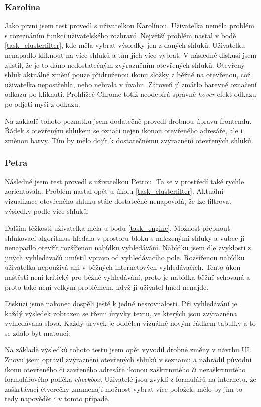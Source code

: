 \subsubsection{Karolína}
Jako první jsem test provedl s uživatelkou Karolínou. Uživatelka neměla problém s rozeznáním funkcí uživatelského rozhraní. Největší problém nastal v bodě \ref{task_clusterfilter}, kde měla vybrat výsledky jen z daných shluků. Uživatelku nenapadlo kliknout na více shluků a tím jich více vybrat. V následné diskusi jsem zjistil, že je to dáno nedostatečným zvýrazněním otevřených shluků. Otevřený shluk aktuálně změní pouze přidruženou ikonu složky z běžné na otevřenou, což uživatelka nepostřehla, nebo nebrala v úvahu. Zároveň jí zmátlo barevné označení odkazu po kliknutí. Prohlížeč Chrome totiž neodebírá správně \emph{hover} efekt odkazu po odjetí myši z odkazu.

Na základě tohoto poznatku jsem dodatečně provedl drobnou úpravu frontendu. Řádek s otevřeným shlukem se označí nejen ikonou otevřeného adresáře, ale i změnou barvy. Tím by mělo dojít k dostatečnému zvýraznění otevřených shluků.

\subsubsection{Petra}
Následně jsem test provedl s uživatelkou Petrou. Ta se v prostředí také rychle zorientovala. Problém nastal opět u úkolu \ref{task_clusterfilter}. Aktuální vizualizace otevřeného shluku stále dostatečně nenapovídá, že lze filtrovat výsledky podle více shluků.

Dalším těžkosti uživatelka měla u bodu \ref{task_engine}. Možnost přepnout shlukovací algoritmus hledala v prostoru bloku s nalezenými shluky a vůbec ji nenapadlo otevřít rozšířenou nabídku vyhledávání. Nabídku jsem dle zvyklostí z jiných vyhledávačů umístil vpravo od vyhledávacího pole. Rozšířenou nabídku uživatelka nepoužívá ani v běžných internetových vyhledávačích. Tento úkon naštěstí není kritický pro běžné vyhledávání, proto je nabídka běžně schovaná a proto také není velkým problémem, když ji uživatel hned nenajde. 

Diskuzí jsme nakonec dospěli ještě k jedné nesrovnalosti. Při vyhledávání je každý výsledek zobrazen se třemi úryvky textu, ve kterých jsou zvýrazněna vyhledávaná slova. Každý úryvek je oddělen vizuálně novým řádkem tabulky a to se zdálo být matoucí.

Na základě výsledků tohoto testu jsem opět vyvodil drobné změny v návrhu UI. Znovu jsem opravil zvýraznění otevřených shluků v seznamu a nahradil původní ikonu otevřeného či zavřeného adresáře ikonou zaškrtnutého či nezaškrtnutého formulářového políčka \emph{checkbox}. Uživatelé jsou zvyklí z formulářů na internetu, že zaškrtávací čtverečky znamenají možnost vybrat více položek, mělo by jim to tedy napovědět i v tomto případě.

